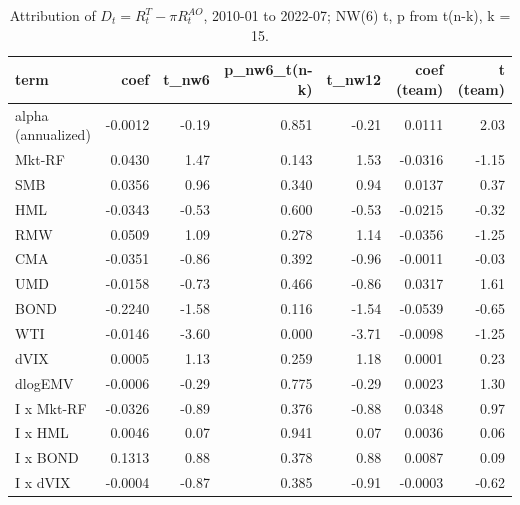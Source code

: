 \begin{table}[htbp]\centering\small
\caption{Attribution of $D_t = R^T_t - \pi R^{AO}_t$, 2010-01 to 2022-07; NW(6) t, p from t(n-k), k = 15.}
\label{tab:m8_attribution}
\begin{tabular}{lrrrrrr}
\toprule
term & coef & t\_nw6 & p\_nw6\_t(n-k) & t\_nw12 & coef (team) & t (team) \\
\midrule
alpha (annualized) & -0.0012 & -0.19 & 0.851 & -0.21 & 0.0111 & 2.03 \\
Mkt-RF & 0.0430 & 1.47 & 0.143 & 1.53 & -0.0316 & -1.15 \\
SMB & 0.0356 & 0.96 & 0.340 & 0.94 & 0.0137 & 0.37 \\
HML & -0.0343 & -0.53 & 0.600 & -0.53 & -0.0215 & -0.32 \\
RMW & 0.0509 & 1.09 & 0.278 & 1.14 & -0.0356 & -1.25 \\
CMA & -0.0351 & -0.86 & 0.392 & -0.96 & -0.0011 & -0.03 \\
UMD & -0.0158 & -0.73 & 0.466 & -0.86 & 0.0317 & 1.61 \\
BOND & -0.2240 & -1.58 & 0.116 & -1.54 & -0.0539 & -0.65 \\
WTI & -0.0146 & -3.60 & 0.000 & -3.71 & -0.0098 & -1.25 \\
dVIX & 0.0005 & 1.13 & 0.259 & 1.18 & 0.0001 & 0.23 \\
dlogEMV & -0.0006 & -0.29 & 0.775 & -0.29 & 0.0023 & 1.30 \\
I x Mkt-RF & -0.0326 & -0.89 & 0.376 & -0.88 & 0.0348 & 0.97 \\
I x HML & 0.0046 & 0.07 & 0.941 & 0.07 & 0.0036 & 0.06 \\
I x BOND & 0.1313 & 0.88 & 0.378 & 0.88 & 0.0087 & 0.09 \\
I x dVIX & -0.0004 & -0.87 & 0.385 & -0.91 & -0.0003 & -0.62 \\
\bottomrule
\end{tabular}
\end{table}
